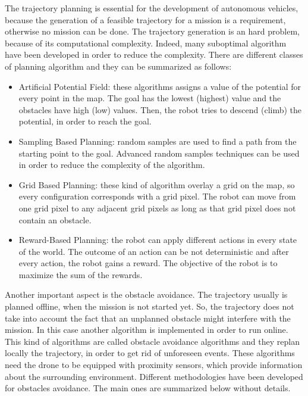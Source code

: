 The trajectory planning is essential for the development of autonomous vehicles,
because the generation of a feasible trajectory for a mission is a requirement,
otherwise no mission can be done.
The trajectory generation is an hard problem, because of its computational complexity.
Indeed, many suboptimal algorithm have been developed in order to reduce the
complexity.
There are different classes of planning algorithm and they can be summarized as follows:
\begin{itemize}
  \item Artificial Potential Field: these algorithms assigns a value of the potential
  for every point in the map. The goal has the lowest (highest) value and the obstacles
  have high (low) values. Then, the robot tries to descend (climb) the potential,
  in order to reach the goal.

  \item Sampling Based Planning: random samples are used to find a path from the
  starting point to the goal. Advanced random samples techniques can be used in order
  to reduce the complexity of the algorithm.

  \item Grid Based Planning: these kind of algorithm overlay a grid on the map, so
  every configuration corresponds with a grid pixel.
  The robot can move from one grid pixel to any adjacent grid pixels as long
  as that grid pixel does not contain an obstacle.

  \item Reward-Based Planning: the robot can apply different actions in every state
  of the world. The outcome of an action can be not deterministic and after every
  action, the robot gains a reward. The objective of the robot is to maximize the
  sum of the rewards.
\end{itemize}

Another important aspect is the obstacle avoidance. The trajectory usually is planned
offline, when the mission is not started yet. So, the trajectory does not take into
account the fact that an unplanned obstacle might interfere with the mission. In this
case another algorithm is implemented in order to run online. This kind of algorithms
are called obstacle avoidance algorithms and they replan locally the trajectory, in
order to get rid of unforeseen events. These algorithms need the drone to be equipped
with proximity sensors, which provide information about the surrounding environment.
Different methodologies have been developed for obstacles avoidance. The main ones are
summarized below without details.

